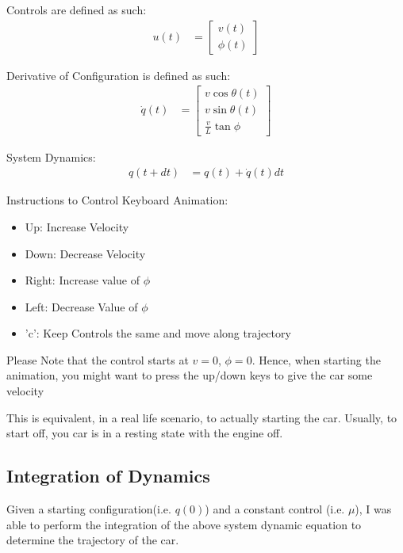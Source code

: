 \documentclass{article}
\begin{document}
Controls are defined as such: \newline 
\begin{align}
    u(t) &= \begin{bmatrix}
           v(t) \\
           \phi(t)
         \end{bmatrix}
\end{align}

Derivative of Configuration is defined as such: \newline 
\begin{align}
    \dot{q}(t) &= \begin{bmatrix}
           v\cos{\theta(t)} \\
           v\sin{\theta(t)} \\
           \frac{v}{L} \tan{\phi}
         \end{bmatrix}
\end{align}

System Dynamics: \newline 
\begin{align}
    q(t + dt) &= q(t) + \dot{q}(t) dt
\end{align}

Instructions to Control Keyboard Animation: \newline 

\begin{itemize}
    \item Up: Increase Velocity
    \item Down: Decrease Velocity
    \item Right: Increase value of $\phi$
    \item Left: Decrease Value of $\phi$
    \item 'c': Keep Controls the same and move along trajectory
\end{itemize}

Please Note that the control starts at $v = 0$, $\phi = 0$. Hence, when starting the animation, you might want to press the up/down keys to give the car some velocity \newline 

This is equivalent, in a real life scenario, to actually starting the car. Usually, to start off, you car is in a resting state with the engine off. \newline 

\subsection{Integration of Dynamics}
Given a starting configuration(i.e. $q(0)$) and a constant control (i.e. $\mu$), I was able to perform the integration of the above system dynamic equation to determine the trajectory of the car. 
\end{document}
